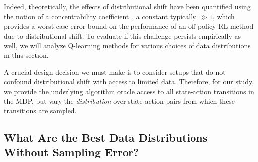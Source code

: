 Indeed, theoretically, the effects of distributional shift have been quantified using the notion of a concentrability coefficient~\citep{munos2005erroravi}, a constant typically $\gg 1$, which provides a worst-case error bound on the performance of an off-policy RL method due to distributional shift. To evaluate if this challenge persists empirically as well, we will analyze Q-learning methods for various choices of data distributions in this section.

A crucial design decision we must make is to consider setups that do not confound distributional shift with access to limited data. Therefore, for our study, we provide the underlying algorithm oracle access to all state-action transitions in the MDP, but vary the \emph{distribution} over state-action pairs from which these transitions are sampled.



\vspace{-0.2cm}
\subsection{What Are the Best Data Distributions Without Sampling Error?}
\label{subsec:dist_shift_exact}
\vspace{-0.2cm}

